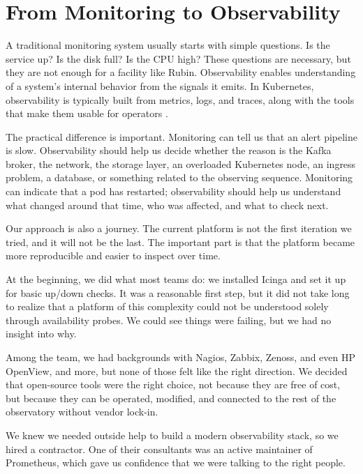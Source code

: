 \section{From Monitoring to Observability}

A traditional monitoring system usually starts with simple questions. Is the service up? Is the
disk full? Is the CPU high? These questions are necessary, but they are not enough for a facility
like Rubin. Observability enables understanding of a system's internal behavior from the signals it
emits. In Kubernetes, observability is typically built from metrics, logs, and traces, along with
the tools that make them usable for operators \cite{kubernetes-observability}.

The practical difference is important. Monitoring can tell us that an alert pipeline is slow.
Observability should help us decide whether the reason is the Kafka broker, the network, the
storage layer, an overloaded Kubernetes node, an ingress problem, a database, or something related
to the observing sequence. Monitoring can indicate that a pod has restarted; observability should
help us understand what changed around that time, who was affected, and what to check next.

Our approach is also a journey. The current platform is not the first iteration we tried, and it
will not be the last. The important part is that the platform became more reproducible and easier
to inspect over time.

At the beginning, we did what most teams do: we installed Icinga and set it up for basic up/down
checks. It was a reasonable first step, but it did not take long to realize that a platform of this
complexity could not be understood solely through availability probes. We could see things were
failing, but we had no insight into why.

Among the team, we had backgrounds with Nagios, Zabbix, Zenoss, and even HP OpenView, and more,
but none of those felt like the right direction. We decided that open-source tools were the right
choice, not because they are free of cost, but because they can be operated, modified, and
connected to the rest of the observatory without vendor lock-in.

We knew we needed outside help to build a modern observability stack, so we hired a contractor.
One of their consultants was an active maintainer of Prometheus, which gave us confidence that we
were talking to the right people.

